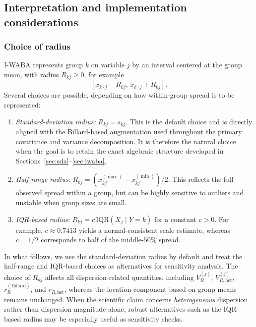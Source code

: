 \documentclass[preprint, times, 12pt, authoryear]{elsarticle}
\begin{document}
\subsection{Interpretation and implementation considerations}\label{sec:practical}

\subsubsection{Choice of radius}

I-WABA represents group $k$ on variable $j$ by an interval centered at the group mean, with radius $R_{kj}\ge 0$, for example
\[
[\bar{x}_{k\cdot j}-R_{kj},\,\bar{x}_{k\cdot j}+R_{kj}].
\]
Several choices are possible, depending on how within-group spread is to be represented:
\begin{enumerate}[label=(\alph*)]
	\item \emph{Standard-deviation radius:} $R_{kj}=s_{kj}$. This is the default choice and is directly aligned with the Billard-based augmentation used throughout the primary covariance and variance decomposition. It is therefore the natural choice when the goal is to retain the exact algebraic structure developed in Sections~\ref{sec:sda}--\ref{sec:iwaba}.
	\item \emph{Half-range radius:} $R_{kj}=(x_{kj}^{(\max)}-x_{kj}^{(\min)})/2$. This reflects the full observed spread within a group, but can be highly sensitive to outliers and unstable when group sizes are small.
	\item \emph{IQR-based radius:} $R_{kj}=c\,\mathrm{IQR}(X_j\mid Y=k)$ for a constant $c>0$. For example, $c\approx 0.7413$ yields a normal-consistent scale estimate, whereas $c=1/2$ corresponds to half of the middle-$50\%$ spread.
\end{enumerate}

In what follows, we use the standard-deviation radius by default and treat the half-range and IQR-based choices as alternatives for sensitivity analysis. The choice of $R_{kj}$ affects all dispersion-related quantities, including $V_R^{(j)}$, $V_{R,\mathrm{het}}^{(j)}$, $r_R^{(\mathrm{Billard})}$, and $r_{R,\mathrm{het}}$, whereas the location component based on group means remains unchanged. When the scientific claim concerns \emph{heterogeneous} dispersion rather than dispersion magnitude alone, robust alternatives such as the IQR-based radius may be especially useful as sensitivity checks.
\end{document}
